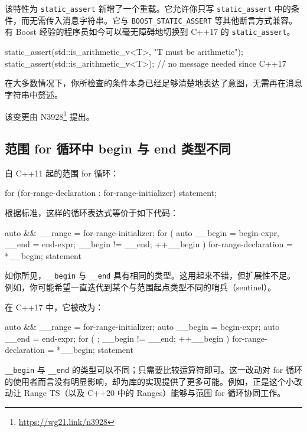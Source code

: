 该特性为 \texttt{static\_assert} 新增了一个重载。它允许你只写 \texttt{static\_assert} 中的条件，而无需传入消息字符串。它与 \texttt{BOOST\_STATIC\_ASSERT} 等其他断言方式兼容。有 Boost 经验的程序员如今可以毫无障碍地切换到 C++17 的 \texttt{static\_assert}。

\begin{codebox}[cpp]
static_assert(std::is_arithmetic_v<T>, "T must be arithmetic");
static_assert(std::is_arithmetic_v<T>); // no message needed since C++17
\end{codebox}

在大多数情况下，你所检查的条件本身已经足够清楚地表达了意图，无需再在消息字符串中赘述。

\begin{myInfoBox}
该变更由 N3928\footnote{\url{https://wg21.link/n3928}} 提出。
\end{myInfoBox}

\subsection{范围 for 循环中 begin 与 end 类型不同}

自 C++11 起的范围 for 循环：

\begin{codebox}[cpp]
for (for-range-declaration : for-range-initializer)
{
statement;
}
\end{codebox}

根据标准，这样的循环表达式等价于如下代码：

\begin{codebox}[cpp]
{
auto && __range = for-range-initializer;
for ( auto __begin = begin-expr, __end = end-expr;
__begin != __end;
++__begin ) {
for-range-declaration = *__begin;
statement
}
}
\end{codebox}

如你所见，\texttt{\_\_begin} 与 \texttt{\_\_end} 具有相同的类型。这用起来不错，但扩展性不足。例如，你可能希望一直迭代到某个与范围起点类型不同的哨兵（sentinel）。

在 C++17 中，它被改为：

\begin{codebox}[cpp]
{
auto && __range = for-range-initializer;
auto __begin = begin-expr;
auto __end = end-expr;
for ( ; __begin != __end; ++__begin ) {
for-range-declaration = *__begin;
statement
}
}
\end{codebox}

\texttt{\_\_begin} 与 \texttt{\_\_end} 的类型可以不同；只需要比较运算符即可。这一改动对 for 循环的使用者而言没有明显影响，却为库的实现提供了更多可能。例如，正是这个小改动让 Range TS（以及 C++20 中的 Ranges）能够与范围 for 循环协同工作。

